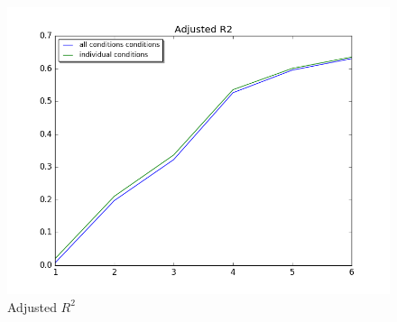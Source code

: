 \begin{figure}
\begin{minipage}[b]{0.33\linewidth}
	\end{minipage}
		
	\begin{minipage}[b]{0.33\linewidth}
		\centering
		\includegraphics[width=.8\linewidth]{../images/adjr2_better}  
		\caption{Adjusted $R^2$}
		\label{fig:adjr2}

	\end{minipage}

\end{figure}

	
	
